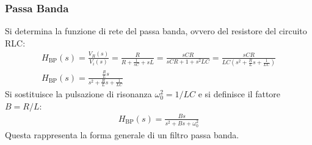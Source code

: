 \documentclass{article}
\numberwithin{equation}{subsection}
\begin{document}
\subsubsection{Passa Banda}

Si determina la funzione di rete del passa banda, ovvero del resistore del circuito RLC:
\begin{gather*}
    H_{\mathrm{BP}}(s)=\displaystyle\frac{V_R(s)}{V_i(s)}=\frac{R}{R+\displaystyle\frac{1}{sC}+sL}=\frac{sCR}{sCR+1+s^2LC}=\frac{sCR}{LC\left(\displaystyle s^2+\frac{R}{L}s+\frac{1}{LC}\right)}\\
    H_{\mathrm{BP}}(s)=\displaystyle\frac{\displaystyle\frac{R}{L}s}{\displaystyle s^2+\frac{R}{L}s+\frac{1}{LC}}
\end{gather*}
Si sostituisce la pulsazione di risonanza $\omega_0^2=1/LC$ e si definisce il fattore $B=R/L$:
\begin{gather}
    H_{\mathrm{BP}}(s)=\displaystyle\frac{Bs}{s^2+Bs+\omega_0^2}
\end{gather}
Questa rappresenta la forma generale di un filtro passa banda. 
\end{document}
